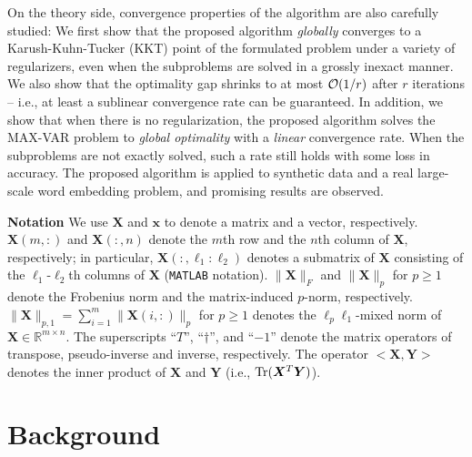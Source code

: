 \documentclass[10pt,journal]{IEEEtran}
\newcommand{\X}{\boldsymbol{X}}
\begin{document}
On the theory side, convergence properties of the algorithm are also carefully studied:
We first show that the proposed algorithm \emph{globally} converges to a Karush-Kuhn-Tucker (KKT) point of the formulated problem under a variety of regularizers, even when the subproblems are solved in a grossly inexact manner.
We also show that the optimality gap shrinks to at most ${\cal O}(1/r)$ after $r$ iterations -- i.e.,
at least a sublinear convergence rate can be guaranteed.
In addition, we show that when there is no regularization, the proposed algorithm solves the MAX-VAR problem to \textit{global optimality} with a \textit{linear} convergence rate.
When the subproblems are not exactly solved, such a rate still holds with some loss in accuracy.
The proposed algorithm is applied to synthetic data and a real large-scale word embedding problem, and promising results are observed.

\bigskip

\noindent
{\bf Notation} We use $\X$ and ${\bm x}$ to denote a matrix and a vector, respectively.
$\X(m,:)$ and $\X(:,n)$ denote the $m$th row and the $n$th column of $\X$, respectively;
in particular, $\X(:,\ell_1:\ell_2)$ denotes a submatrix of $\X$ consisting of the $\ell_1$-$\ell_2$th columns of $\X$ (\texttt{MATLAB} notation).
$\|\X\|_F$ and $\|\X\|_p$ for $p\geq 1$ denote the Frobenius norm and the matrix-induced $p$-norm, respectively. $\|\X\|_{p,1} = \sum_{i=1}^m \|\X(i,:)\|_p$ for $p\geq 1$ denotes the $\ell_p\ell_1$-mixed norm of $\X\in\mathbb{R}^{m\times n}$.
The superscripts ``$T$'', ``$\dag$'', and ``${-1}$'' denote the matrix operators of transpose, pseudo-inverse and inverse, respectively. 
The operator $<{\bm X},{\bm Y}>$ denotes the inner product of ${\bm X}$ and ${\bm Y}$ (i.e., ${\rm Tr}({\bm X}^T{\bm Y})$).

\section{Background}
\end{document}
